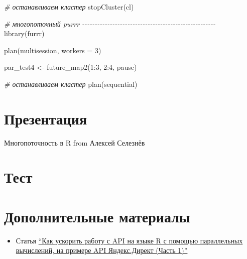\documentclass[
]{book}
\newenvironment{Shaded}{\begin{snugshade}}{\end{snugshade}}
\newcommand{\AttributeTok}[1]{\textcolor[rgb]{0.77,0.63,0.00}{#1}}
\newcommand{\CommentTok}[1]{\textcolor[rgb]{0.56,0.35,0.01}{\textit{#1}}}
\newcommand{\DecValTok}[1]{\textcolor[rgb]{0.00,0.00,0.81}{#1}}
\newcommand{\FunctionTok}[1]{\textcolor[rgb]{0.00,0.00,0.00}{#1}}
\newcommand{\NormalTok}[1]{#1}
\newcommand{\OtherTok}[1]{\textcolor[rgb]{0.56,0.35,0.01}{#1}}
\newcommand{\SpecialCharTok}[1]{\textcolor[rgb]{0.00,0.00,0.00}{#1}}
\newcommand{\StringTok}[1]{\textcolor[rgb]{0.31,0.60,0.02}{#1}}
\providecommand{\tightlist}{%
  \setlength{\itemsep}{0pt}\setlength{\parskip}{0pt}}
\begin{document}
\begin{Shaded}
\begin{Highlighting}[]
\CommentTok{\# останавливаем кластер}
\FunctionTok{stopCluster}\NormalTok{(cl)}

\CommentTok{\# многопоточный purrr {-}{-}{-}{-}{-}{-}{-}{-}{-}{-}{-}{-}{-}{-}{-}{-}{-}{-}{-}{-}{-}{-}{-}{-}{-}{-}{-}{-}{-}{-}{-}{-}{-}{-}{-}{-}{-}{-}{-}{-}{-}{-}{-}{-}{-}{-}{-}{-}{-}{-}{-}{-}{-}}
\FunctionTok{library}\NormalTok{(furrr)}

\FunctionTok{plan}\NormalTok{(}\StringTok{\textquotesingle{}multisession\textquotesingle{}}\NormalTok{, }\AttributeTok{workers =} \DecValTok{3}\NormalTok{)}

\NormalTok{par\_test4 }\OtherTok{\textless{}{-}} \FunctionTok{future\_map2}\NormalTok{(}\DecValTok{1}\SpecialCharTok{:}\DecValTok{3}\NormalTok{, }\DecValTok{2}\SpecialCharTok{:}\DecValTok{4}\NormalTok{, pause)}

\CommentTok{\# останавливаем кластер}
\FunctionTok{plan}\NormalTok{(}\StringTok{\textquotesingle{}sequential\textquotesingle{}}\NormalTok{)}
\end{Highlighting}
\end{Shaded}

\hypertarget{ux43fux440ux435ux437ux435ux43dux442ux430ux446ux438ux44f-3}{%
\section{Презентация}\label{ux43fux440ux435ux437ux435ux43dux442ux430ux446ux438ux44f-3}}

Многопоточность в R from Алексей Селезнёв

\hypertarget{ux442ux435ux441ux442-5}{%
\section{Тест}\label{ux442ux435ux441ux442-5}}

\hypertarget{ux434ux43eux43fux43eux43bux43dux438ux442ux435ux43bux44cux43dux44bux435-ux43cux430ux442ux435ux440ux438ux430ux43bux44b-2}{%
\section{Дополнительные материалы}\label{ux434ux43eux43fux43eux43bux43dux438ux442ux435ux43bux44cux43dux44bux435-ux43cux430ux442ux435ux440ux438ux430ux43bux44b-2}}

\begin{itemize}
\tightlist
\item
  Статья \href{https://habr.com/ru/post/437078/}{``Как ускорить работу с API на языке R с помощью параллельных вычислений, на примере API Яндекс.Директ (Часть 1)''}
\end{itemize}
\end{document}
